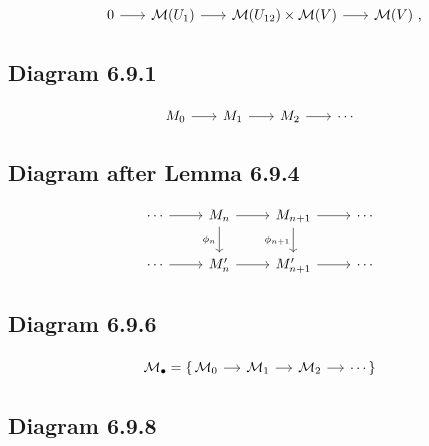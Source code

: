 \documentclass[leqno]{amsart}
\begin{document}
	\begin{equation*}
		\begin{tikzcd}[sep=scriptsize]
			0 \arrow{r} & \mathcal{M}(U_1) \arrow{r} & \mathcal{M}(U_{12}) \times \mathcal{M}(V) \arrow{r} & \mathcal{M}(V) \rlap{\  ,}
		\end{tikzcd}
	\end{equation*}

	\subsection*{Diagram 6.9.1}

	\begin{equation*}
		\begin{tikzcd}[sep=scriptsize]
			M_0 \arrow{r} & M_1 \arrow{r} & M_2 \arrow{r} & \cdots
		\end{tikzcd}
	\end{equation*}

	\subsection*{Diagram after Lemma 6.9.4}

	\begin{equation*}
		\begin{tikzcd}
			\cdots \arrow{r} & M_{n} \arrow{r} \arrow{d}[swap]{\phi_n} & M_{n+1} \arrow{r} \arrow{d}[swap]{\phi_{n+1}} & \cdots \\ 
			\cdots \arrow{r} & M_{n}^{\prime} \arrow{r} & M_{n+1}^{\prime} \arrow{r} & \cdots
		\end{tikzcd}
	\end{equation*}

	\subsection*{Diagram 6.9.6}

	\begin{equation*}
		\begin{tikzcd}[sep=small]
			\mathcal{M}_{\bullet} = \{ \, \mathcal{M}_0 \arrow{r} & \mathcal{M}_1 \arrow{r} & \mathcal{M}_2 \arrow{r} & \cdots \, \}
		\end{tikzcd}
	\end{equation*}

	\subsection*{Diagram 6.9.8}
\end{document}
